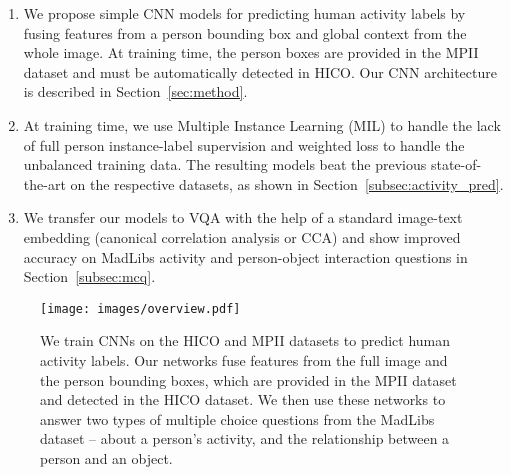 \documentclass[runningheads]{llncs}
\begin{document}
\begin{enumerate}
\item We propose simple CNN models for predicting human activity labels by fusing features from a person bounding box and global context from the whole image. At training time, the person boxes are provided in the MPII dataset and must be automatically detected in HICO. Our CNN architecture is described in Section~\ref{sec:method}. 
\item At training time, we use Multiple Instance Learning (MIL) to handle the lack of full person instance-label supervision and weighted loss to handle the unbalanced training data. The resulting models beat the previous state-of-the-art on the respective datasets, as shown in Section~\ref{subsec:activity_pred}.
\item We transfer our models to VQA with the help of a standard image-text embedding (canonical correlation analysis or CCA) and show improved accuracy on MadLibs activity and person-object interaction questions in Section~\ref{subsec:mcq}.
\end{enumerate}\vspace{-5mm}\begin{figure}[h!]
    \centering
    \texttt{[image: images/overview.pdf]}
    \caption{We train CNNs on the HICO and MPII datasets to predict human activity labels. Our networks fuse features from the full image and the person bounding boxes, which are provided in the MPII dataset and detected in the HICO dataset. 
    We then use these networks to answer two types of multiple choice questions from the MadLibs dataset -- about a person's activity, and the relationship between a person and an object.}
    \label{fig:overview}
\end{figure}%
\end{document}
